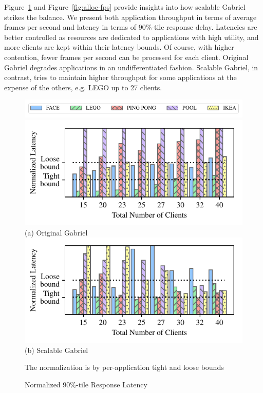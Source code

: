 Figure~\ref{fig:alloc-latency} and Figure~\ref{fig:alloc-fps} provide insights
into how scalable Gabriel strikes the balance. We present both application
throughput in terms of average frames per second and latency in terms of
90\%-tile response delay. Latencies are better controlled as resources are
dedicated to applications with high utility, and more clients are kept within
their latency bounds. Of course, with higher contention, fewer frames per second
can be processed for each client. Original Gabriel degrades applications in an
undifferentiated fashion. Scalable Gabriel, in contrast, tries to maintain
higher throughput for some applications at the expense of the others, e.g. LEGO
up to 27 clients.

\begin{figure}[]
  \begin{center}
    \includegraphics[width=\linewidth]{FIGS/fig-alloc-latency-legend.pdf}
    \includegraphics[width=\linewidth]{FIGS/fig-alloc-latency-baseline.pdf}
    {(a) Original Gabriel}
    \includegraphics[width=\linewidth]{FIGS/fig-alloc-latency-cpushares.pdf}
    {(b) Scalable Gabriel}
  \end{center}
\begin{captiontext}
  \centering
The normalization is  by per-application tight and loose bounds~\cite{chen2017empirical}
\end{captiontext}
  \caption{Normalized 90\%-tile Response Latency}
  \label{fig:alloc-latency}
\end{figure}


